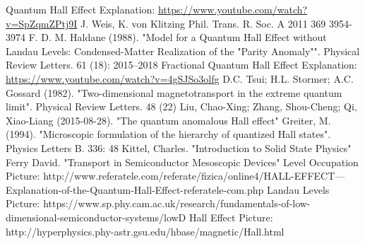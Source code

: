 \documentclass[14pt]{article}
\begin{document}
\begin{thebibliography}{1}
	Quantum Hall Effect Explanation: \url{https://www.youtube.com/watch?v=SpZqmZPtj9I}
	J. Weis, K. von Klitzing Phil. Trans. R. Soc. A 2011 369 3954-3974
	F. D. M. Haldane (1988). "Model for a Quantum Hall Effect without Landau Levels: Condensed-Matter Realization of the "Parity Anomaly"". Physical Review Letters. 61 (18): 2015–2018
	Fractional Quantum Hall Effect Explanation: \url{https://www.youtube.com/watch?v=4gSJSo3olfg}
	D.C. Tsui; H.L. Stormer; A.C. Gossard (1982). "Two-dimensional magnetotransport in the extreme quantum limit". Physical Review Letters. 48 (22)
	Liu, Chao-Xing; Zhang, Shou-Cheng; Qi, Xiao-Liang (2015-08-28). "The quantum anomalous Hall effect"
	Greiter, M. (1994). "Microscopic formulation of the hierarchy of quantized Hall states". Physics Letters B. 336: 48
	Kittel, Charles. "Introduction to Solid State Physics"
	 Ferry David. "Transport in Semiconductor Mesoscopic Devices"
	Level Occupation Picture: http://www.referatele.com/referate/fizica/online4/HALL-EFFECT---Explanation-of-the-Quantum-Hall-Effect-referatele-com.php
	Landau Levels Picture: https://www.sp.phy.cam.ac.uk/research/fundamentals-of-low-dimensional-semiconductor-systems/lowD
	Hall Effect Picture: http://hyperphysics.phy-astr.gsu.edu/hbase/magnetic/Hall.html
	
\end{thebibliography}
\end{document}
